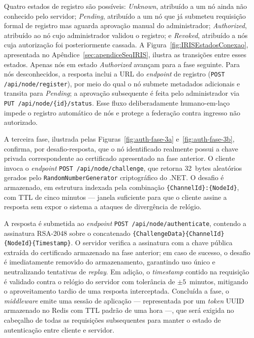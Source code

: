 Quatro estados de registro são possíveis: \textit{Unknown}, atribuído a um nó ainda não conhecido pelo servidor; \textit{Pending}, atribuído a um nó que já submeteu requisição formal de registro mas aguarda aprovação manual do administrador; \textit{Authorized}, atribuído ao nó cujo administrador validou o registro; e \textit{Revoked}, atribuído a nós cuja autorização foi posteriormente cassada. A Figura~\ref{fig:IRISEstadosConexao}, apresentada no Apêndice~\ref{sec:apendiceSeqIRIS}, ilustra as transições entre esses estados. Apenas nós em estado \textit{Authorized} avançam para a fase seguinte. Para nós desconhecidos, a resposta inclui a URL do \textit{endpoint} de registro (\texttt{POST /api/node/register}), por meio do qual o nó submete metadados adicionais e transita para \textit{Pending}; a aprovação subsequente é feita pelo administrador via \texttt{PUT /api/node/\{id\}/status}. Esse fluxo deliberadamente humano-em-laço impede o registro automático de nós e protege a federação contra ingresso não autorizado.

A terceira fase, ilustrada pelas Figuras~\ref{fig:auth-fase-3a} e~\ref{fig:auth-fase-3b}, confirma, por desafio-resposta, que o nó identificado realmente possui a chave privada correspondente ao certificado apresentado na fase anterior. O cliente invoca o \textit{endpoint} \texttt{POST /api/node/challenge}, que retorna 32~bytes aleatórios gerados pelo \texttt{RandomNumberGenerator} criptográfico do .NET. O desafio é armazenado, em estrutura indexada pela combinação \texttt{\{ChannelId\}:\{NodeId\}}, com TTL de cinco minutos --- janela suficiente para que o cliente assine a resposta sem expor o sistema a ataques de divergência de relógio.

A resposta é submetida ao \textit{endpoint} \texttt{POST /api/node/authenticate}, contendo a assinatura RSA-2048 sobre o concatenado \texttt{\{ChallengeData\}\{ChannelId\}\{NodeId\}\{Timestamp\}}. O servidor verifica a assinatura com a chave pública extraída do certificado armazenado na fase anterior; em caso de sucesso, o desafio é imediatamente removido do armazenamento, garantindo uso único e neutralizando tentativas de \textit{replay}. Em adição, o \textit{timestamp} contido na requisição é validado contra o relógio do servidor com tolerância de $\pm 5$~minutos, mitigando o aproveitamento tardio de uma resposta interceptada. Concluída a fase, o \textit{middleware} emite uma sessão de aplicação --- representada por um \textit{token} UUID armazenado no Redis com TTL padrão de uma hora ---, que será exigida no cabeçalho de todas as requisições subsequentes para manter o estado de autenticação entre cliente e servidor.

